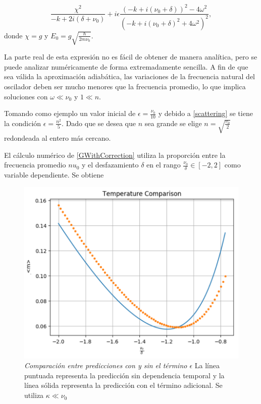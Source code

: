 \documentclass[10pt,a4paper]{report}
\begin{document}
\begin{equation}\label{GWithCorrection}
 \frac{\chi^2}{-k + 2i(\delta + \nu_0)} +i\epsilon\frac{(-k + i(\nu_0 + \delta))^2 - 4\omega^2}{(-k + i(\nu_0 + \delta)^2 + 4\omega^2)^2},
\end{equation} donde $\chi = g$ y $ E_0 = g \sqrt{\frac{\hbar}{2m\nu_0}}$.

La parte real de esta expresión no es fácil de obtener de manera
analítica, pero se puede analizar numéricamente de forma
extremadamente sencilla. A fin de que sea válida la aproximación
adiabática, las variaciones de la frecuencia natural del oscilador
deben ser mucho menores que la frecuencia promedio, lo que
implica soluciones con $\omega \ll \nu_0$ y $1 \ll n$.

Tomando como ejemplo un valor inicial de $\epsilon = \frac{\nu_0}{10}$ y debido a \ref{scattering} se tiene la condición
$\epsilon = \frac{n^2}{5}$. Dado que se desea que $n$ sea grande se
elige $n=\sqrt{\frac{\nu_0}{2}}$ redondeada al entero más cercano.


El cálculo numérico de \eqref{GWithCorrection} utiliza la proporción entre la frecuencia promedio $nu_0$ y
el desfazamiento $\delta$ en el rango
$\frac{\nu_0}{\delta} \in [-2,2]$ como variable dependiente. Se obtiene

\begin{figure}
\includegraphics[scale=.55]{GraficaTemp.pdf} 
\caption{\textit{Comparación entre predicciones con y sin el término $\epsilon$} La línea puntuada representa la predicción sin dependencia temporal y la línea sólida representa la predicción con el término adicional.  Se utiliza $\kappa \ll \nu_0$}
\end{figure}
\end{document}
